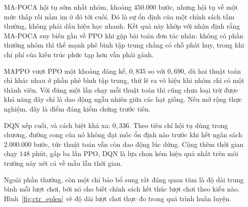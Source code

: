 \indent MA-POCA hội tụ sớm nhất nhóm, khoảng $450.000$ bước, nhưng hội tụ về một mức thấp rồi
nằm im ở đó tới cuối. Đó là sự ổn định của một chính sách tầm thường,
không phải dấu hiệu học nhanh. Kết quả này khớp với nhận định rằng MA-POCA suy biến gần về
PPO khi gặp bài toán đơn tác nhân: không có phần thưởng nhóm thì thế mạnh phê bình tập
trung chẳng có chỗ phát huy, trong khi chi phí của kiến trúc phức tạp hơn vẫn phải gánh.

\indent MAPPO vượt PPO một khoảng đáng kể, $0{,}835$ so với $0{,}690$, dù hai thuật toán chỉ
khác nhau ở phần phê bình tập trung, thứ lẽ ra vô hiệu khi nhóm chỉ có một thành viên. Với đúng
một lần chạy mỗi thuật
toán thì cũng chưa loại trừ được khả năng đây chỉ là dao động ngẫu nhiên giữa các hạt
giống. Nếu mở rộng thực nghiệm, đây là điểm đáng kiểm chứng trước tiên.

\indent DQN xếp cuối, và cách biệt khá xa: $0{,}336$. Theo tiêu chí
hội tụ dùng trong chương, đường cong của nó không đạt mốc ổn định nào trước khi hết ngân sách
$2.000.000$ bước, tức thuật toán vẫn còn dao động lúc dừng. Cộng thêm thời gian chạy $148$ phút,
gấp ba lần PPO, DQN là lựa chọn kém hiệu quả nhất trên môi
trường này xét cả về mẫu lẫn thời gian.

\indent Ngoài phần thưởng, còn một chỉ báo bổ sung rất đáng quan tâm là độ dài trung bình
mỗi lượt chơi, bởi nó cho biết chính sách kết thúc lượt chơi theo kiểu nào.
Hình~\ref{fig:ctr_eplen} vẽ độ dài lượt chơi thực đo trong quá trình huấn luyện.

